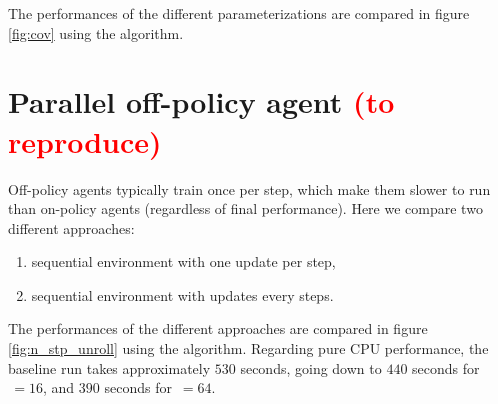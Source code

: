 The performances of the different parameterizations are compared in figure \ref{fig:cov} using the \ppo algorithm.



\section{Parallel off-policy agent \textcolor{red}{(to reproduce)}}

Off-policy agents typically train once per step, which make them slower to run than on-policy agents (regardless of final performance). Here we  compare two different approaches:

\begin{enumerate}
	\item sequential environment with one update per step,
	\item sequential environment with  updates every  steps.
\end{enumerate}

The performances of the different approaches are compared in figure \ref{fig:n_stp_unroll} using the \tdt algorithm. Regarding pure CPU performance, the baseline run takes approximately $530$ seconds, going down to $440$ seconds for $\, = 16$, and $390$ seconds for $\, = 64$.


